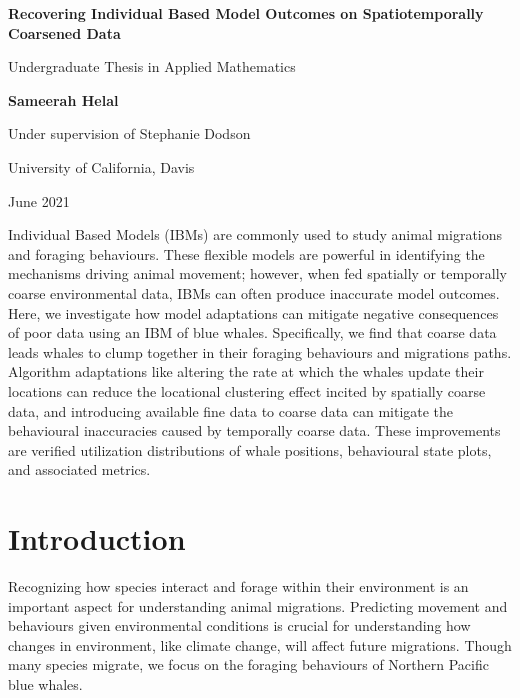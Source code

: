 \documentclass[11pt]{article}
\begin{document}
\vspace*{0ex}

\begin{center}
    {\Large \textbf{ Recovering Individual Based Model Outcomes on Spatiotemporally Coarsened Data}}

    \vspace{3px}

    Undergraduate Thesis in Applied Mathematics

    \vspace{0.5cm}

    \textbf{Sameerah Helal}

    Under supervision of Stephanie Dodson

    \vspace{0.5cm}
    
    University of California, Davis

    June 2021
\end{center}

\vspace{1cm}

Individual Based Models (IBMs) are commonly used to study animal migrations and foraging behaviours. These flexible models are powerful in identifying the mechanisms driving animal movement; however, when fed spatially or temporally coarse environmental data, IBMs can often produce inaccurate model outcomes. Here, we investigate how model adaptations can mitigate negative consequences of poor data using an IBM of blue whales. Specifically, we find that coarse data leads  whales to clump together in their foraging behaviours and migrations paths. Algorithm adaptations like altering the rate at which the whales update their locations can reduce the locational clustering effect incited by spatially coarse data, and introducing available fine data to coarse data can mitigate the behavioural inaccuracies caused by temporally coarse data. These improvements are verified utilization distributions of whale positions, behavioural state plots, and associated metrics.
\newpage

\tableofcontents

\newpage

\setlength{\parskip}{0.75em}
\section{Introduction}
Recognizing how species interact and forage within their environment is an important aspect for understanding animal migrations. Predicting movement and behaviours given environmental conditions is crucial for understanding how changes in environment, like climate change, will affect future migrations. Though many species migrate, we focus on the foraging behaviours of Northern Pacific blue whales.\par
\end{document}
